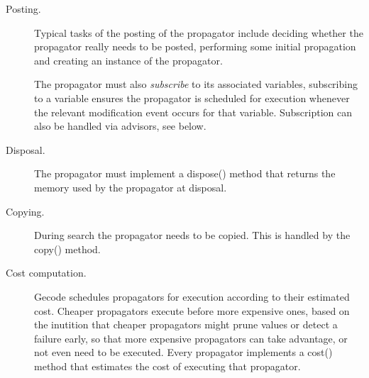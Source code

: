 \documentclass[a4paper,11pt]{article}
\numberwithin{equation}{section}
\begin{document}
\begin{description}
  \item[Posting.] 
    Typical tasks of the posting of the propagator include
    deciding whether the propagator really needs to be posted,
    performing some initial propagation and creating an
    instance of the propagator.
    
    The propagator must also \emph{subscribe} to its associated variables,
    subscribing to a variable ensures the propagator is scheduled
    for execution whenever the relevant modification event occurs
    for that variable. Subscription can also be handled via
    advisors, see below.

  \item[Disposal.] The propagator must implement a dispose() method that
    returns the memory used by the propagator at disposal.

  \item[Copying.] During search the propagator needs to be copied. This is
    handled by the copy() method.

  \item[Cost computation.] Gecode schedules propagators for execution according
    to their estimated cost. Cheaper propagators execute before more expensive
    ones, based on the inutition that cheaper propagators might prune values
    or detect a failure early, so that more expensive propagators can take
    advantage, or not even need to be executed. Every propagator implements
    a cost() method that estimates the cost of executing that propagator.


\end{description}
\end{document}
